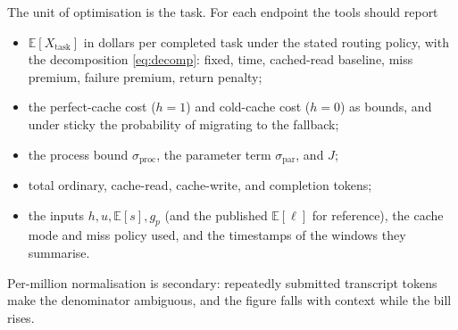 \documentclass[11pt]{article}
\newcommand{\E}{\mathbb{E}}
\begin{document}
The unit of optimisation is the task. For each endpoint the tools should report
\begin{itemize}
  \item $\E[X_{\text{task}}]$ in dollars per completed task under the stated
        routing policy, with the decomposition \eqref{eq:decomp}: fixed, time,
        cached-read baseline, miss premium, failure premium, return penalty;
  \item the perfect-cache cost ($h = 1$) and cold-cache cost ($h = 0$) as
        bounds, and under \textsf{sticky} the probability of migrating to the
        fallback;
  \item the process bound $\sigma_{\text{proc}}$, the parameter term
        $\sigma_{\text{par}}$, and $J$;
  \item total ordinary, cache-read, cache-write, and completion tokens;
  \item the inputs $h, u, \E[s], g_p$ (and the published $\E[\ell]$ for reference), the cache mode and miss policy used,
        and the timestamps of the windows they summarise.
\end{itemize}
Per-million normalisation is secondary: repeatedly submitted transcript tokens
make the denominator ambiguous, and the figure falls with context while the
bill rises.
\end{document}
